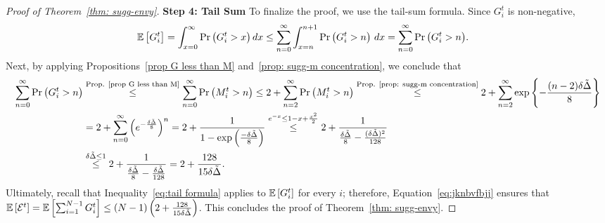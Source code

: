\begin{proof}[Proof of Theorem~\ref{thm: sugg-envy}]
\textbf{Step 4: Tail Sum}
To finalize the proof, we use the tail-sum formula. Since $G_i^t$ is non-negative,
\begin{align*}
\mathbb{E}\left[ G_i^t \right] &=
    \int_{x=0}^{\infty} \Pr\left( G_i^t > x \right)dx \leq
    \sum_{n=0}^{\infty}{\int_{x=n}^{n+1} \Pr\left( G_i^t > n \right) \,dx}=
    \sum_{n=0}^{\infty}{\Pr\left( G_i^t > n \right)}.
\end{align*}    
Next, by applying Propositions~\ref{prop G less than M} and~\ref{prop: sugg-m concentration}, we conclude that
\begin{align}\label{eq:tail formula}
    \sum_{n=0}^{\infty}{\Pr\left( G_i^t > n \right)}& \stackrel{\textnormal{Prop. \ref{prop G less than M}}}{\leq} \sum_{n=0}^{\infty}{\Pr\left( M_i^t > n \right)} \leq 2+ \sum_{n=2}^{\infty}{\Pr\left( M_i^t > n \right)}   \stackrel{\textnormal{Prop. \ref{prop: sugg-m concentration}}}{\leq} 2+ \sum_{n=2}^{\infty}\exp{\left\{-\frac{(n-2)\delta \tilde\Delta}{8} \right\}}\nonumber \\
    &= 2+ \sum_{n=0}^{\infty}\left(e^{-\frac{\delta \tilde\Delta}{8}} \right)^n = 2+\frac{1}{1-\exp{\left(\frac{-\delta \tilde\Delta}{8} \right)}} \stackrel{e^{-x}\leq 1-x+\frac{x^2}{2}}{\leq}
    2+\frac{1}{\frac{\delta \tilde\Delta}{8}-\frac{(\delta \tilde\Delta)^2}{128}}
 \nonumber \\
    & \stackrel{\delta \tilde\Delta \leq 1}{\leq} 2+\frac{1}{\frac{\delta \tilde\Delta}{8}-\frac{\delta \tilde\Delta}{128}} = 2+\frac{128}{15\delta \tilde\Delta}.
\end{align}
Ultimately, recall that Inequality~\eqref{eq:tail formula} applies to $\mathbb{E}\left[ G_i^t \right]$ for every $i$; therefore, Equation~\eqref{eq:jknbvfbjj} ensures that $\mathbb{E}\left[ \mathcal{E}^t \right]=\mathbb{E}\left[ \sum_{i=1}^{N-1} G_i^t \right] \leq (N-1)\left(2+\frac{128}{15\delta \tilde\Delta}\right) $. This concludes the proof of Theorem~\ref{thm: sugg-envy}.
\end{proof}

{\color{green}




}
